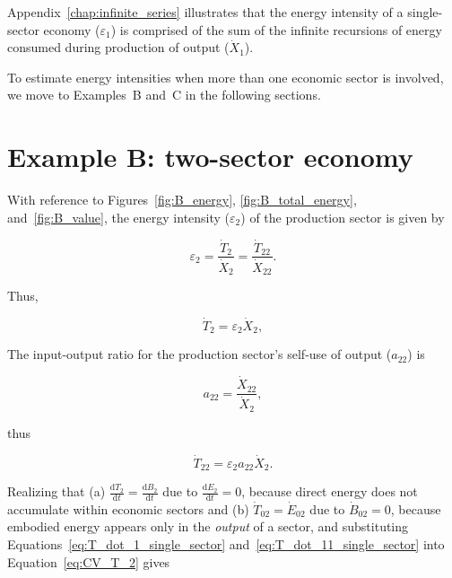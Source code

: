 Appendix~\ref{chap:infinite_series} illustrates that the energy 
intensity of a single-sector economy ($\varepsilon_{1}$) 
is comprised of the sum of the infinite recursions
of energy consumed during production of output ($\dot{X}_{1}$).

To estimate energy intensities
when more than one economic sector is involved, 
we move to Examples~B and~C in the following sections.


\section{Example B: two-sector economy} %

With reference to Figures~\ref{fig:B_energy}, 
\ref{fig:B_total_energy},
and~\ref{fig:B_value}, 
the energy intensity ($\varepsilon_{2}$) 
of the production sector is given by

\begin{equation} \label{eq:single_sector_energy_intensity}
	\varepsilon_{2} 
	= \frac{\dot{T}_{2}}{\dot{X}_{2}} 
	= \frac{\dot{T}_{22}}{\dot{X}_{22}}.
\end{equation}

\noindent{}Thus,

\begin{equation} \label{eq:T_dot_1_single_sector}
	\dot{T}_{2} = \varepsilon_{2}\dot{X}_{2},
\end{equation}

The input-output ratio 
for the production sector's self-use of output ($a_{22}$) is

\begin{equation} \label{eq:io_ratio_single_sector}
	a_{22} = \frac{\dot{X}_{22}}{\dot{X}_{2}},
\end{equation}

\noindent{}thus

\begin{equation} \label{eq:T_dot_11_single_sector}
	\dot{T}_{22} = \varepsilon_{2}a_{22}\dot{X}_{2}.
\end{equation}

Realizing that 
(a) $\frac{\mathrm{d}T_2}{\mathrm{d}t} = \frac{\mathrm{d}B_2}{\mathrm{d}t}$ 
due to $\frac{\mathrm{d}E_2}{\mathrm{d}t} = 0$, because direct energy
does not accumulate within economic sectors and
(b) $\dot{T}_{02} = \dot{E}_{02}$ due to $\dot{B}_{02} = 0$, 
because embodied energy appears only in the \emph{output} of a sector, and
substituting Equations~\ref{eq:T_dot_1_single_sector} 
and~\ref{eq:T_dot_11_single_sector} into Equation~\ref{eq:CV_T_2} gives

